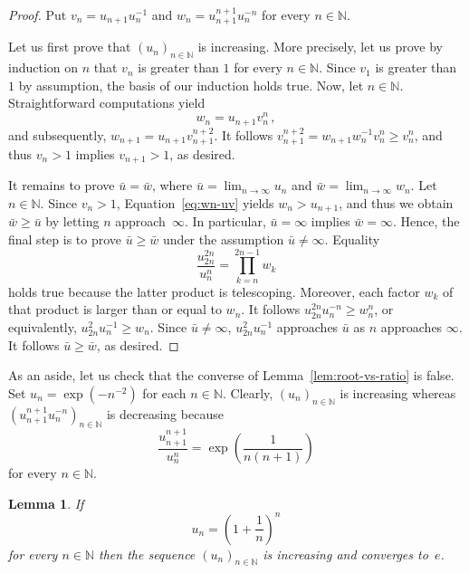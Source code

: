 \documentclass[12pt]{article}
\newcommand{\bN}{\mathbb{N}} %
\newtheorem{lemma}{Lemma}
\begin{document}
\begin{proof}
 Put
  $v_n = u_{n + 1} u_n^{-1}$
  and
  $w_n = u_{n + 1}^{n + 1} u_n^{- n}$
  for every $n \in \bN$.
  
  Let us first prove that $\left( u_n \right)_{n \in \bN}$ is increasing.
  More precisely, let us prove by induction on $n$ that $v_n$ is greater than $1$ for every $n \in \bN$.
  Since $v_1$ is greater than $1$ by assumption,
  the basis of our induction holds true.
  Now, let $n \in \bN$. %
  Straightforward computations yield
  \begin{equation} \label{eq:wn-uv}
    w_n = u_{n + 1}v_n^n \,, 
  \end{equation} 
  and subsequently, 
  $w_{n + 1} = u_{n + 1} v_{n + 1}^{n + 2}$.
  It follows  
  $v_{n + 1}^{n + 2}= w_{n + 1}w_n^{-1} v_n^n \ge v_n^n$,
  and thus $v_n > 1$ implies $v_{n + 1} > 1$, as desired.

  It remains to prove $\bar u = \bar w$, where 
  $\bar u = \lim_{n \to \infty} u_n$ and 
  $\bar w = \lim_{n \to \infty} w_n$.
  Let $n \in \bN$.
  Since $v_n > 1$,
  Equation~\eqref{eq:wn-uv} yields $w_n > u_{n + 1}$,
  and thus we obtain $\bar w \ge \bar u$ by letting $n$ approach~$\infty$.
  In particular, $\bar u = \infty$ implies $\bar w = \infty$.
  Hence, the final step is to prove $\bar u \ge \bar w$ under the assumption $\bar u \ne \infty$.
  Equality 
  $$
  \frac{u_{2n}^{2n}}{ u_n^n} =  \prod_{k = n}^{2n - 1} w_k
  $$
  holds true because the latter product is telescoping.
  Moreover, each factor $w_k$ of that product is larger than or equal to $w_n$.
  It follows 
  $u_{2n}^{2n} u_n^{-n} \ge w_n^n$, 
  or equivalently,
  $u_{2n}^2u_n^{- 1}  \ge  w_n$.
  Since $\bar u \ne \infty$, 
  $u_{2n}^2 u_n^{-1}$ approaches $\bar u$ as $n$ approaches $\infty$.
  It follows $\bar u \ge \bar w$, as desired.
\end{proof}

As an aside, let us check that the converse of Lemma~\ref{lem:root-vs-ratio} is false.
Set $ u_n = \exp \left( - n^{- 2} \right)$ for each $n \in \bN$.
Clearly,  $\left( u_n \right)_{n \in \bN}$  is increasing whereas
$\left(  u_{n + 1}^{n + 1}  u_n^{-n} \right)_{n \in \bN}$ is decreasing because 
$$
\frac{u_{n + 1}^{n + 1}}{u_n^n} = \exp \left(\frac{1}{n (n + 1)} \right) 
$$
for every $n \in \bN$.



\begin{lemma} \label{lem:convergence-to-e}
  If
  $$
  u_n = \left( 1 + \frac{1}{n} \right)^n
  $$
  for every $n \in \bN$ then the sequence $\left( u_n  \right)_{n \in \bN}$ is increasing and converges to~$e$.
\end{lemma}
\end{document}
